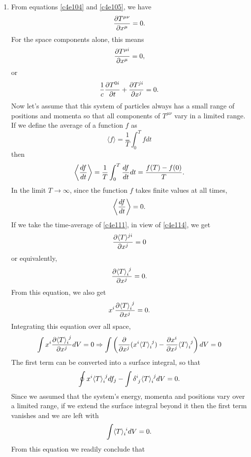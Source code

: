 \begin{enumerate}
\item From equations \eqref{c4e104} and \eqref{c4e105}, we have
\begin{equation}\label{c4e110}
\frac{\partial{T^{\mu\nu}}}{\partial{x^\mu}} = 0.
\end{equation}
For the space components alone, this means
\[
\frac{\partial{T^{\mu i}}}{\partial{x^\mu}} = 0,
\]
or
\begin{equation}\label{c4e111}
\frac{1}{c}\frac{\partial{T^{0i}}}{\partial{t}} + \frac{\partial{T^{ji}}}{\partial{x^j}} = 0.
\end{equation}
Now let's assume that this system of particles always has a small range of
positions and momenta so that all components of $T^{\mu\nu}$ vary in a limited
range. If we define the average of a function $f$ as
\begin{equation}\label{c4e112}
\langle f \rangle = \frac{1}{T}\int_0^T fdt
\end{equation}
then
\begin{equation}\label{c4e113}
\left\langle\frac{d{f}}{d{t}}\right\rangle = \frac{1}{T} \int_0^T \frac{d{f}}{d{t}}dt = \frac{f(T) - f(0)}{T}.
\end{equation}
In the limit $T \rightarrow \infty$, since the function $f$ takes finite
values at all times,
\begin{equation}\label{c4e114}
\left\langle\frac{d{f}}{d{t}}\right\rangle = 0.
\end{equation}
If we take the time-average of \eqref{c4e111}, in view of \eqref{c4e114}, we get
\[
\frac{\partial{\langle T\rangle^{ji}}}{\partial{x^j}} = 0
\]
or equivalently,
\begin{equation}\label{c4e115}
\pdt{\tensor{\langle T \rangle}{_i^j}}{x^j} = 0.
\end{equation}
From this equation, we also get
\[
x^i\pdt{\tensor{\langle T \rangle}{_i^j}}{x^j} = 0.
\]
Integrating this equation over all space,
\[
\int x^i\pdt{\tensor{\langle T \rangle}{_i^j}}{x^j} dV = 0 \Rightarrow 
\int \left(\frac{\partial}{\partial x^j}(x^i\tensor{\langle T \rangle}{_i^j}) - 
\pdt{x^i}{x^j}\tensor{\langle T \rangle}{_i^j}\right)dV = 0
\]
The first term can be converted into a surface integral, so that
\[
\oint x^i\tensor{\langle T \rangle}{_i^j} df_j - 
\int \tensor{\delta}{^i_j}\tensor{\langle T \rangle}{_i^j} dV = 0.
\]
Since we assumed that the system's energy, momenta and positions vary over a 
limited range, if we extend the surface integral beyond it then the first term
vanishes and we are left with
\begin{equation}\label{c4e116}
\int \tensor{\langle T \rangle}{_i^i} dV = 0.
\end{equation}
From this equation we readily conclude that

\end{enumerate}
